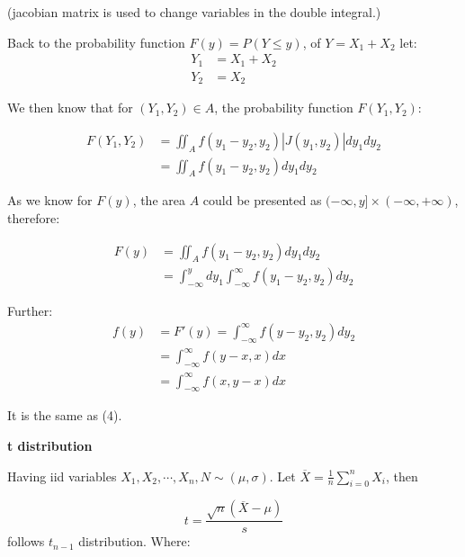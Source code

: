 \documentclass{article}
\newcommand{\Sum}[2]{\sum_{#2=0}^n#1_i}
\begin{document}
(jacobian matrix is used to change variables in the double integral.)
\vspace{3mm}

Back to the probability function \(F(y)=P(Y\leq y)\), of \(Y=X_1+X_2\) let:
\begin{equation}
\begin{split}
    Y_1&=X_1+X_2\\
    Y_2&=X_2
\end{split}
\end{equation}

We then know that for \((Y_1,Y_2)\in A\), the probability function \(F(Y_1,Y_2)\):

\begin{equation}
\begin{split}
F(Y_1, Y_2)&=\iint_Af(y_1-y_2, y_2)|J(y_1,y_2)|dy_1dy_2\\
&=\iint_Af(y_1-y_2,y_2)dy_1dy_2
\end{split}
\end{equation}

As we know for \(F(y)\), the area \(A\) could be presented as \((-\infty, y]\times(-\infty, +\infty)\),
therefore:

\begin{equation}
\begin{split}
F(y)&=\iint_Af(y_1-y_2,y_2)dy_1dy_2\\
&=\int_{-\infty}^{y}dy_1\int_{-\infty}^{\infty}f(y_1-y_2,y_2)dy_2
\end{split}
\end{equation}

Further:
\begin{equation}
\begin{split}
f(y)&=F'(y)=\int_{-\infty}^{\infty}f(y-y_2,y_2)dy_2\\
&=\int_{-\infty}^{\infty}f(y-x,x)dx\\
&=\int_{-\infty}^{\infty}f(x,y-x)dx
\end{split}
\end{equation}

It is the same as (4).

\textbf{t distribution}

Having iid variables \(X_1, X_2, \cdots, X_n, N\sim (\mu, \sigma)\).
Let \(\overline{X}=\frac{1}{n}\Sum{X}{i}\), then

\begin{equation}
    t=\frac{\sqrt{n}(\overline{X}-\mu)}{s}
\end{equation}
follows \(t_{n-1}\) distribution. Where:
\end{document}
